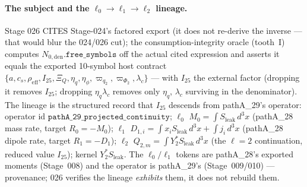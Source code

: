 \paragraph{The subject and the \(\ell_0\!\to\!\ell_1\!\to\!\ell_2\) lineage.}
Stage 026 CITES Stage-024's factored export (it does not re-derive the inverse --- that would blur the
024/026 cut); the consumption-integrity oracle (tooth~I) computes \(N_{0,\mathrm{den}}.\texttt{free\_symbols}\)
off the actual cited expression and asserts it equals the exported 10-symbol host contract
\(\{a,c_s,\rho_{\mathrm{eff}},I_{25},\Xi_Q,\eta_q,\eta_\phi,\varpi_{q_2},\varpi_{\Phi_2},\lambda_c\}\) --- with
\(I_{25}\) the external factor (dropping it removes \(I_{25}\); dropping \(\eta_q\lambda_c\) removes only
\(\eta_q\), \(\lambda_c\) surviving in the denominator). The lineage is the structured record that \(I_{25}\)
descends from pathA\_29's operator: operator id \(\texttt{pathA\_29\_projected\_continuity}\); \(\ell_0\)
\(M_0=\int S_{\mathrm{leak}}\,d^3x\) (pathA\_28 mass rate, target \(R_0=-M_0\)); \(\ell_1\)
\(D_{1,i}=\int x_i S_{\mathrm{leak}}\,d^3x+\int j_i\,d^3x\) (pathA\_28 dipole rate, target \(R_1=-D_1\));
\(\ell_2\) \(Q_{2,m}=\int Y_2^{*}S_{\mathrm{leak}}\,d^3x\) (the \(\ell=2\) continuation, reduced value
\(I_{25}\)); kernel \(Y_2^{*}S_{\mathrm{leak}}\). The \(\ell_0/\ell_1\) tokens are pathA\_28's exported moments
(Stage~008) and the operator is pathA\_29's (Stage~009/010) --- provenance; 026 verifies the lineage
\emph{exhibits} them, it does not rebuild them.

